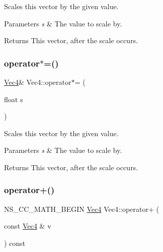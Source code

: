 Scales this vector by the given value.


\begin{DoxyParams}{Parameters}
{\em s} & The value to scale by. \\
\hline
\end{DoxyParams}
\begin{DoxyReturn}{Returns}
This vector, after the scale occurs. 
\end{DoxyReturn}
\mbox{\label{classVec4_a4b1c5f268c536f95acf47f4467d61373}} 
\subsubsection{\texorpdfstring{operator$\ast$=()}{operator*=()}\hspace{0.1cm}{\footnotesize\ttfamily [2/2]}}
{\footnotesize\ttfamily \hyperlink{classVec4}{Vec4}\& Vec4\+::operator$\ast$= (\begin{DoxyParamCaption}\item[{float}]{s }\end{DoxyParamCaption})\hspace{0.3cm}{\ttfamily [inline]}}

Scales this vector by the given value.


\begin{DoxyParams}{Parameters}
{\em s} & The value to scale by. \\
\hline
\end{DoxyParams}
\begin{DoxyReturn}{Returns}
This vector, after the scale occurs. 
\end{DoxyReturn}
\mbox{\label{classVec4_a6e574e817068334beb1ec533bc6cf233}} 
\subsubsection{\texorpdfstring{operator+()}{operator+()}\hspace{0.1cm}{\footnotesize\ttfamily [1/2]}}
{\footnotesize\ttfamily N\+S\+\_\+\+C\+C\+\_\+\+M\+A\+T\+H\+\_\+\+B\+E\+G\+IN \hyperlink{classVec4}{Vec4} Vec4\+::operator+ (\begin{DoxyParamCaption}\item[{const \hyperlink{classVec4}{Vec4} \&}]{v }\end{DoxyParamCaption}) const\hspace{0.3cm}{\ttfamily [inline]}}

